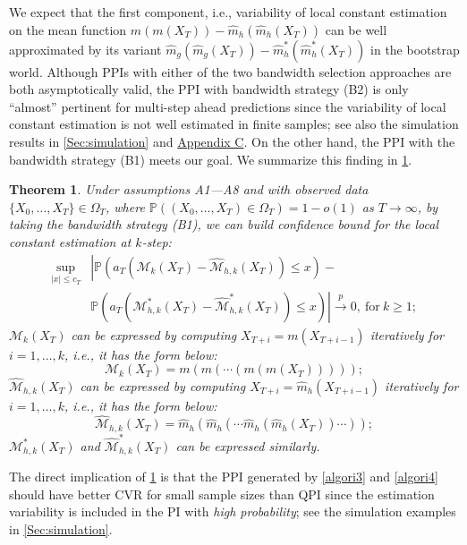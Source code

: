 \documentclass[a4paper]{article}
\newtheorem{Theorem}{Theorem}[section]
\begin{document}
We expect that the first component, i.e., variability of local constant estimation on the mean function $m(m(X_T)) - \widehat{m}_{h}(\widehat{m}_{h}(X_T))$ can be well approximated by its variant $\widehat{m}_{g}(\widehat{m}_{g}(X_T)) -  \widehat{m}^*_{h}(\widehat{m}^*_{h}(X_T))$ in the bootstrap world. Although PPIs with either of the  two bandwidth selection approaches are both asymptotically valid, the PPI with bandwidth strategy (B2) is only ``almost'' pertinent for multi-step ahead predictions since the variability of local constant estimation is not well estimated in finite samples; see also the simulation results in \cref{Sec:simulation} and  \hyperref[Appendix:diffoverunderband]{Appendix C}.  On the other hand, the PPI with the bandwidth strategy (B1) meets our goal. We summarize this finding in \cref{Theorem:PPI_part2}. 
\begin{Theorem}\label{Theorem:PPI_part2}
    Under assumptions A1---A8 and with observed data $\{X_0,\ldots,X_T\}\in \Omega_T$, where $\mathbb{P}((X_0,\ldots,X_T)\in \Omega_T) = 1 - o(1)$ as $T\to \infty$, by taking the bandwidth strategy (B1), we can build confidence bound for the local constant estimation at $k$-step:
\begin{equation}\label{kstepestdist}
\begin{split}
    \sup_{|x|\leq c_{T}} & \left| \mathbb{P}\left( a_T\left(\mathcal{M}_{k}(X_T) - \widehat{\mathcal{M}}_{h,k}(X_T)   \right)\leq x  \right) -  \right. \\
    &\left. \mathbb{P}\left( a_T\left(\mathcal{M}^*_{h,k}(X_T) - \widehat{\mathcal{M}}_{h,k}^*(X_T)   \right)\leq x  \right)
     \right| \overset{p}{\to} 0,~\text{for}~k \geq 1;
\end{split}
\end{equation}
$\mathcal{M}_{k}(X_T)$ can be expressed by computing $X_{T+i} = m(X_{T+i-1})$ iteratively for $i = 1,\ldots, k$, i.e., it has the  form   below:
\begin{equation}
\mathcal{M}_{k}(X_T) = m(m(\cdots (m(m(X_T)))));
\end{equation}
$\widehat{\mathcal{M}}_{h,k}(X_T) $ can be expressed by computing $X_{T+i} = \widehat{m}_{h}(X_{T+i-1})$ iteratively for $i = 1,\ldots, k$, i.e., it has the form  below:
\begin{equation}
\widehat{\mathcal{M}}_{h,k}(X_T) = \widehat{m}_h(\widehat{m}_h(\cdots \widehat{m}_h(\widehat{m}_h(X_T))\cdots));
\end{equation}
$\mathcal{M}^*_{h,k}(X_T) $ and $\widehat{\mathcal{M}}_{h,k}^*(X_T)$ can be expressed similarly. 
\end{Theorem}
The direct implication of \cref{Theorem:PPI_part2} is that the PPI generated by \cref{algori3} and \cref{algori4} should have better CVR for small sample sizes than QPI since the estimation variability is included in the PI with \textit{high probability}; see the simulation examples in \cref{Sec:simulation}.   
\end{document}
